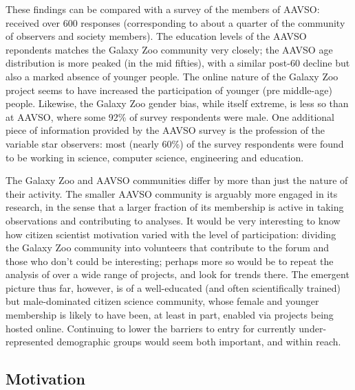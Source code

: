 \documentclass{ar2e}
\begin{document}
These findings can be compared with a survey of the members of AAVSO:
\citet{P+P2012} received over 600 responses (corresponding to about a quarter
of the community of observers and society members). The education levels of
the AAVSO repondents matches the Galaxy Zoo community very closely; the AAVSO
age distribution is more peaked (in the mid fifties), with a similar post-60
decline but also a marked absence of younger people. The online nature of the
Galaxy Zoo project seems to have increased the participation of younger (pre
middle-age) people. Likewise, the Galaxy Zoo gender bias, while itself
extreme, is less so than at AAVSO, where some 92\% of survey respondents were
male. One additional piece of information provided by the AAVSO survey is the
profession of the variable star observers: most (nearly 60\%) of the survey
respondents were found to be working in science, computer science, engineering
and education. 

The Galaxy Zoo and AAVSO communities differ by more than just the nature of
their activity. The smaller AAVSO community is arguably more engaged in its
research, in the sense that a larger fraction of its membership is active in
taking observations and contributing to analyses. It would be very interesting
to know how citizen scientist motivation varied with the level of
participation: dividing the Galaxy Zoo community into volunteers that
contribute to the  forum and those who don't could be interesting; perhaps
more so would be to repeat the analysis of \citeauthor{Rad++2013} over a wide
range of projects, and look for trends there. The emergent picture thus far,
however, is of a well-educated (and often scientifically trained)  but
male-dominated citizen science community, whose female and younger membership
is likely to have been, at least in part, enabled via projects being hosted
online. Continuing to lower the barriers to entry for currently
under-represented demographic groups would seem both important, and within
reach.



\subsection{Motivation}
\label{sec:crowd:motivation}

\end{document}
